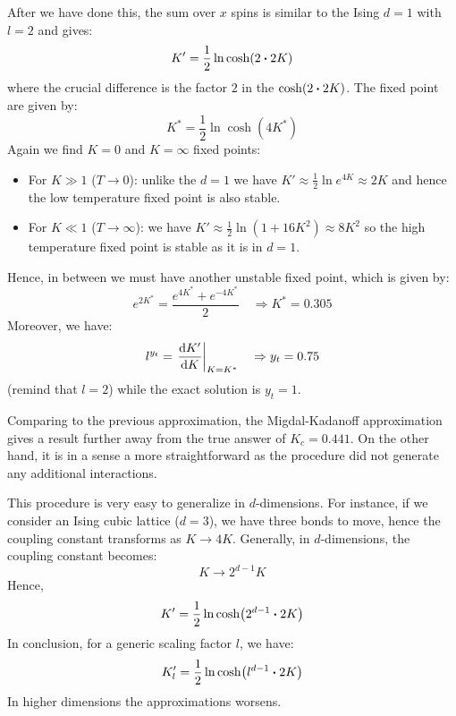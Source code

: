 \documentclass[../../Main/Main.tex]{subfiles}
\begin{document}
After we have done this, the sum over \( x \) spins is similar to the Ising \( d=1 \) with \( l=2 \) and gives:
\begin{equation*}
  K' = \frac{1}{2} \ln \cosh (2 \vdot 2K)
\end{equation*}
where the crucial difference is the factor \( 2 \) in the \(\cosh (2 \vdot 2K)  \).
 The fixed point are given by:
\begin{equation*}
  K^* = \frac{1}{2} \ln \cosh (4 K^*)
\end{equation*}
Again we find \( K=0 \) and \( K= \infty  \)  fixed points:
\begin{itemize}
\item For \( K \gg 1 \) (\( T \rightarrow 0 \)):  unlike the \( d=1 \) we have \( K' \approx \frac{1}{2} \ln e^{4K} \approx 2K \) and hence the low temperature fixed point is also stable.
\item For \( K \ll 1 \) (\( T \rightarrow \infty  \)): we have \( K' \approx \frac{1}{2} \ln (1+16K^2) \approx 8K^2 \) so the high temperature fixed point is stable as it is in \( d=1 \).
\end{itemize}
Hence, in between we must have another unstable fixed point, which is given by:
\begin{equation*}
  e^{2K^*} = \frac{e^{4K^*} + e^{-4K^*}}{2} \quad \Rightarrow K^* = 0.305
\end{equation*}
Moreover, we have:
\begin{equation*}
  l^{y_t} = \eval{\dv{K'}{K} }_{K=K^*} \quad \Rightarrow y_t = 0.75
\end{equation*}
(remind that \( l=2 \)) while the exact solution is \( y_t = 1 \).

Comparing to the previous approximation, the Migdal-Kadanoff approximation gives a result further away from the true answer of \( K_c = 0.441 \). On the other hand, it is in a sense a more straightforward as the procedure did not generate any additional interactions.

This procedure is very easy to generalize in \( d \)-dimensions. For instance, if we consider an Ising cubic lattice (\( d=3 \)), we have three bonds to move, hence the coupling constant transforms as \( K \rightarrow 4K \). Generally, in \( d \)-dimensions, the coupling constant becomes:
\begin{equation*}
  K \rightarrow 2^{d-1}  K
\end{equation*}
Hence,
\begin{equation}
  K' = \frac{1}{2} \ln \cosh(2^{d-1} \vdot 2K)
\end{equation}
In conclusion, for a generic scaling factor \( l \), we have:
\begin{equation}
  K_l' = \frac{1}{2} \ln \cosh(l^{d-1} \vdot 2K)
\end{equation}
In higher dimensions the approximations worsens.
\end{document}
